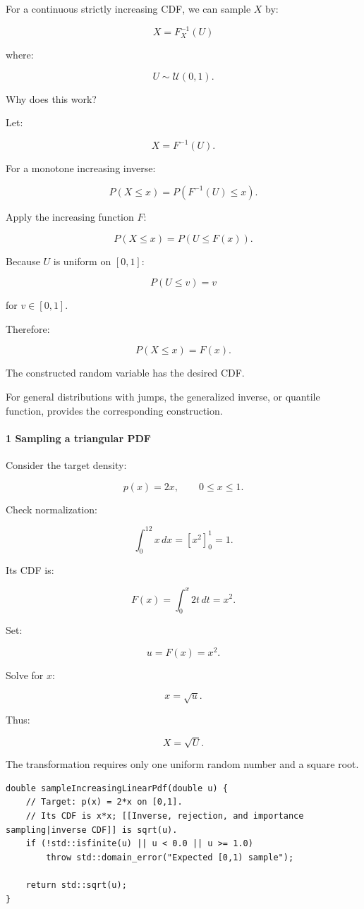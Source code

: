For a continuous strictly increasing CDF, we can sample \(X\) by:

\[
 \boxed{X=F_X^{-1}(U)}
\]

where:

\[
 U\sim\mathcal U(0,1).
\]

Why does this work?

Let:

\[
 X=F^{-1}(U).
\]

For a monotone increasing inverse:

\[
 P(X\le x) = P(F^{-1}(U)\le x).
\]

Apply the increasing function \(F\):

\[
 P(X\le x)=P(U\le F(x)).
\]

Because \(U\) is uniform on \([0,1]\):

\[
 P(U\le v)=v
\]

for \(v\in[0,1]\).

Therefore:

\[
 \boxed{P(X\le x)=F(x)}.
\]

The constructed random variable has the desired CDF.

For general distributions with jumps, the generalized inverse, or quantile function, provides the corresponding construction.

\paragraph{1 Sampling a triangular PDF}\label{sampling-a-triangular-pdf}

Consider the target density:

\[
 p(x)=2x,\qquad0\le x\le1.
\]

Check normalization:

\[
 \int_0^12x\,dx = [x^2]_0^1=1.
\]

Its CDF is:

\[
 F(x)=\int_0^x2t\,dt=x^2.
\]

Set:

\[
 u=F(x)=x^2.
\]

Solve for \(x\):

\[
 \boxed{x=\sqrt u}.
\]

Thus:

\[
 \boxed{X=\sqrt U}.
\]

The transformation requires only one uniform random number and a square root.

\begin{verbatim}
double sampleIncreasingLinearPdf(double u) {
    // Target: p(x) = 2*x on [0,1].
    // Its CDF is x*x; [[Inverse, rejection, and importance sampling|inverse CDF]] is sqrt(u).
    if (!std::isfinite(u) || u < 0.0 || u >= 1.0)
        throw std::domain_error("Expected [0,1) sample");

    return std::sqrt(u);
}
\end{verbatim}

